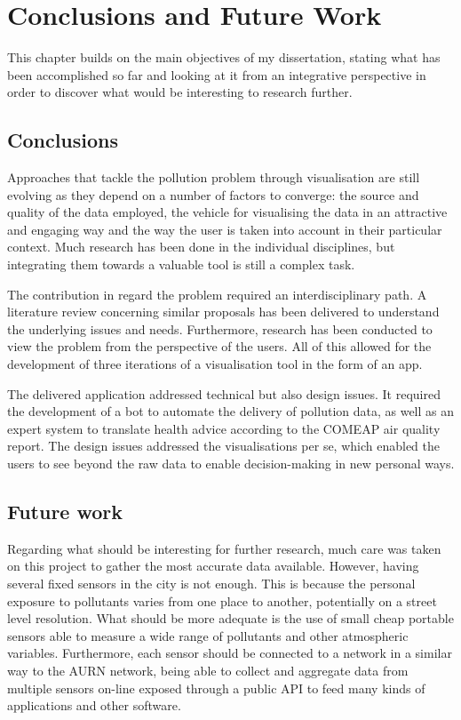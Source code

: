 \chapter{Conclusions and Future Work}
This chapter builds on the main objectives of my dissertation, stating what has been accomplished so far and  looking at it from an integrative perspective in order to discover what would be interesting to research further. 

\section{Conclusions}

Approaches that tackle the pollution problem through visualisation are still evolving as they depend on a number of factors to converge: the source and quality of the data employed, the vehicle for visualising the data in an attractive and engaging way and the way the user is taken into account in their particular context. Much research has been done in the individual disciplines, but integrating them towards a valuable tool is still a complex task.

The contribution in regard the problem required an interdisciplinary path. A literature review concerning similar proposals has been delivered to understand the underlying issues and needs. Furthermore, research has been conducted to view the problem from the perspective of the users. All of this allowed for the development of three iterations of a visualisation tool in the form of an app.

The delivered application addressed technical but also design issues. It required the development of a bot to automate the delivery of pollution data, as well as an expert system to translate health advice according to the COMEAP air quality report. The design issues addressed the visualisations per se, which enabled the users to see beyond the raw data to enable decision-making in new personal ways. 

\section{Future work}
Regarding what should be interesting for further research, much care was taken on this project to gather the most accurate data available. However, having several fixed sensors in the city is not enough. This is because the personal exposure to pollutants varies from one place to another, potentially on a street level resolution. What should be more adequate is the use of small cheap portable sensors able to measure a wide range of pollutants and other atmospheric variables. Furthermore, each sensor should be connected to a network in a similar way to the AURN network, being able to collect and aggregate data from multiple sensors on-line  exposed through a public API to feed many kinds of applications and other software.

